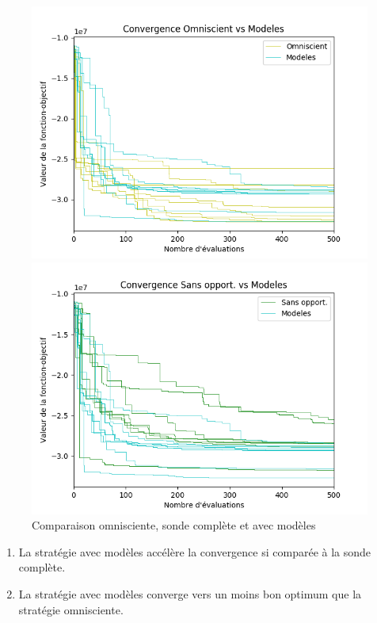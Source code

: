 \documentclass{beamer}
\begin{document}
\begin{frame}
\noindent
\begin{center}
\begin{figure}
\vspace{-1em}
\begin{minipage}[t]{0.5\linewidth}
\includegraphics[width=\linewidth]{sty3.png}
\end{minipage}%
\hfill%
\begin{minipage}[t]{0.5\linewidth}
\includegraphics[width=\linewidth]{sty4.png}
\end{minipage}
\vspace{-1.5em}
\caption{Comparaison omnisciente, sonde complète et avec modèles}
\vspace{-1em}
\end{figure}
\begin{enumerate}
\pause
\item La stratégie avec modèles accélère la convergence si comparée à la sonde complète.
\pause
\item La stratégie avec modèles converge vers un moins bon optimum que la stratégie omnisciente.
\end{enumerate}
\end{center}
\end{frame}
\end{document}
